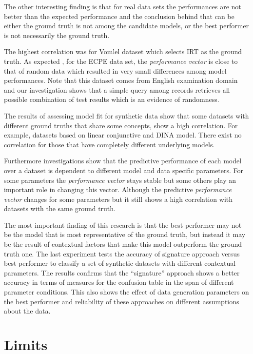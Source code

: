 The other interesting finding is that for real data sets the performances are not better than the expected performance and the conclusion behind that can be either the ground truth is not among the candidate models, or the best performer is not necessarily the ground truth. 



The highest correlation was for Vomlel dataset which selects IRT as the ground truth. As expected , for the ECPE data set, the \textit{performance vector} is close to that of random data which resulted in very small differences among model performances. Note that this dataset comes from English examination domain and our investigation shows that a simple query among records retrieves all possible combination of test results which is an evidence of randomness.

The results of assessing model fit for synthetic data show that some datasets with different ground truths that share some concepts, show a high correlation. For example, datasets based on linear conjunctive and DINA model. There exist no correlation for those that have completely different underlying models.

Furthermore investigations show that the predictive performance of each model over a dataset is dependent to different model and data specific parameters. For some parameters the \textit{performance vector} stays stable but some others play an important role in changing this vector. Although the predictive \textit{performance vector} changes for some parameters but it still shows a high correlation with datasets with the same ground truth.


The most important finding of this research is that the best performer may not be the model that is most representative of the ground truth, but instead it may be the result of contextual factors that make this model outperform the ground truth one. The last experiment tests the accuracy of signature approach versus best performer to classify a set of synthetic datasets with different contextual parameters. The results confirms that the ``signature'' approach shows a better accuracy in terms of measures for the confusion table in the span of different parameter conditions. This also shows the effect of data generation parameters on the best performer and reliability of these approaches on different assumptions about the data.

\section{Limits}

